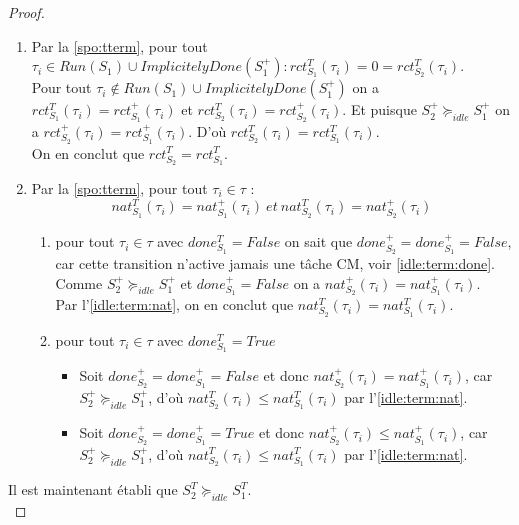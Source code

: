 \documentclass[12pt,a4paper,oneside]{book}
\theoremstyle{break}
\theoremstyle{breakplain}
\begin{document}
\begin{proof}
\begin{enumerate}
\item Par la \autoref{spo:tterm}, pour tout $\tau_i \in Run(S_1) \cup ImplicitelyDone(S_1^+) : rct_{S_1}^T(\tau_i) = 0 = rct_{S_2}^T(\tau_i)$.\\
Pour tout $\tau_i \notin Run(S_1) \cup ImplicitelyDone(S_1^+)$ on a $rct_{S_1}^T(\tau_i) = rct_{S_1}^+(\tau_i)$ et $rct_{S_2}^T(\tau_i) = rct_{S_2}^+(\tau_i)$. Et puisque $S^+_2 \succeq_{idle} S^+_1$ on a $rct_{S_2}^+(\tau_i)= rct_{S_1}^+(\tau_i)$. D'où $rct_{S_2}^T(\tau_i) = rct_{S_1}^T(\tau_i)$.\\
On en conclut que $rct_{S_2}^T = rct_{S_1}^T$.

\item Par la \autoref{spo:tterm}, pour tout $\tau_i \in \tau$ :
\begin{equation}
\label{idle:term:nat}
nat_{S_1}^T(\tau_i) = nat_{S_1}^+(\tau_i)\ et\ nat_{S_2}^T(\tau_i) = nat_{S_2}^+(\tau_i)
\end{equation}

\begin{enumerate}
\item pour tout $\tau_i \in \tau$ avec $done_{S_1}^T = False$ on sait que $done_{S_2}^+ = done_{S_1}^+ = False$, car cette transition n'active jamais une tâche CM, voir \autoref{idle:term:done}. Comme $S^+_2 \succeq_{idle} S^+_1$ et $done_{S_1}^+ = False$ on a $nat_{S_2}^+(\tau_i)= nat_{S_1}^+(\tau_i)$.\\
Par l'\autoref{idle:term:nat}, on en conclut que $nat_{S_2}^T(\tau_i) = nat_{S_1}^T(\tau_i)$.

\item pour tout $\tau_i \in \tau$ avec $done_{S_1}^T = True$
\begin{itemize}
\item Soit $done_{S_2}^+ = done_{S_1}^+ = False$ et donc $nat_{S_2}^+(\tau_i)= nat_{S_1}^+(\tau_i)$, car $S^+_2 \succeq_{idle} S^+_1$, d'où $nat_{S_2}^T(\tau_i) \le nat_{S_1}^T(\tau_i)$ par l'\autoref{idle:term:nat}.
\item Soit $done_{S_2}^+ = done_{S_1}^+ = True$ et donc $nat_{S_2}^+(\tau_i)\le nat_{S_1}^+(\tau_i)$, car $S^+_2 \succeq_{idle} S^+_1$, d'où $nat_{S_2}^T(\tau_i) \le nat_{S_1}^T(\tau_i)$ par l'\autoref{idle:term:nat}.\\
\end{itemize}
\end{enumerate}

\end{enumerate}

Il est maintenant établi que $S^T_2 \succeq_{idle} S^T_1$.\\


\end{proof}
\end{document}
